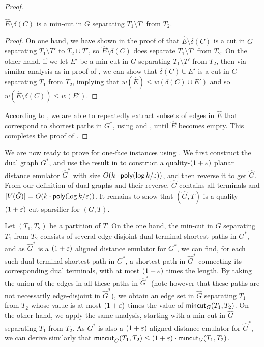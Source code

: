 \begin{proof}
	\begin{claim}
		\label{clm: recursive}
		$\hat E\setminus \delta(C)$ is a min-cut in $G$ separating $T_1\setminus T'$ from $T_2$.
	\end{claim}
	\begin{proof}
		On one hand, we have shown in the proof of  that $\hat E\setminus \delta(C)$ is a cut in $G$ separating $T_1\setminus T'$ to $T_2\cup T'$, so $\hat E\setminus \delta(C)$ does separate $T_1\setminus T'$ from $T_2$.
		On the other hand, if we let $E'$ be a min-cut in $G$ separating $T_1\setminus T'$ from $T_2$, then via similar analysis as in proof of , we can show that $\delta(C)\cup E'$ is a cut in $G$ separating $T_1$ from $T_2$, implying that $w(\hat E)\le w(\delta(C)\cup E')$ and so $w(\hat E\setminus \delta(C))\le w(E')$.
	\end{proof}
	According to , we are able to repeatedly extract subsets of edges in $\hat E$ that correspond to shortest paths in $G^*$, using  and , until $\hat E$ becomes empty. This completes the proof of . 
\end{proof}


We are now ready to prove  for one-face instances using .
We first construct the dual graph $G^*$, and use the result in \cite{chang2022near} to construct a quality-$(1+{\varepsilon})$ planar distance emulator $\hat G^*$ with size $O(k\cdot \mathsf{poly}(\log k/{\varepsilon}))$, and then reverse it to get $\hat G$. 
From our definition of dual graphs and their reverse, $\hat G$ contains all terminals and $|V(\hat G)|=O(k\cdot \mathsf{poly}(\log k/{\varepsilon}))$. It remains to show that $(\hat G,T)$ is a quality-$(1+{\varepsilon})$ cut sparsifier for $(G,T)$. 

Let $(T_1,T_2)$ be a partition of $T$.
On the one hand, the min-cut in $G$ separating $T_1$ from $T_2$ consists of several edge-disjoint dual terminal shortest paths in $G^*$, and as $\hat G^*$ is a $(1+{\varepsilon})$ aligned distance emulator for $G^*$, we can find, for each such dual terminal shortest path in $G^*$, a shortest path in $\hat G^*$ connecting its corresponding dual terminals, with at most $(1+{\varepsilon})$ times the length. By taking the union of the edges in all these paths in $\hat G^*$ (note however that these paths are not necessarily edge-disjoint in $\hat G^*$), we obtain an edge set in $\hat G$ separating $T_1$ from $T_2$ whose value is at most $(1+{\varepsilon})$ times the value of $\mathsf{mincut}_G(T_1,T_2)$. 
On the other hand, we apply the same analysis, starting with a min-cut in $\hat G$ separating $T_1$ from $T_2$. As $G^*$ is also a $(1+{\varepsilon})$ aligned distance emulator for $\hat G^*$, we can derive similarly that $\mathsf{mincut}_{\hat G}(T_1,T_2)\le (1+{\varepsilon})\cdot \mathsf{mincut}_G(T_1,T_2)$.



